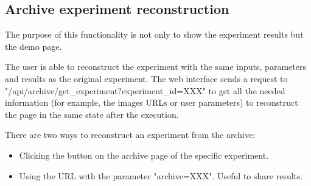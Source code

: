 \subsection{Archive experiment reconstruction}
The purpose of this functionality is not only to show the experiment results but the demo page.

The user is able to reconstruct the experiment with the same inputs, parameters and results as the original experiment. The web interface sends a request to "/api/archive/get\_experiment?experiment\_id=XXX" to get all the needed information (for example, the images URLs or user parameters) to reconstruct the page in the same state after the execution. 

\bigbreak

There are two ways to reconstruct an experiment from the archive:
\begin{itemize}
	\item Clicking the button on the archive page of the specific experiment.
	\item Using the URL with the parameter  "archive=XXX". Useful to share results.
\end{itemize}